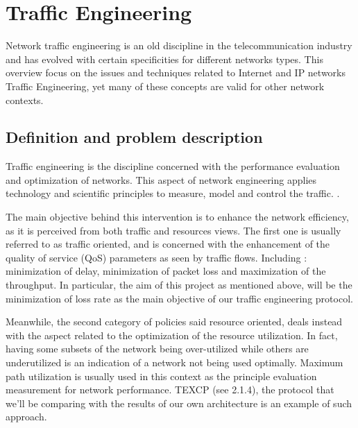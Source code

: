 \section{Traffic Engineering}

Network traffic engineering is an old discipline in the telecommunication industry and has evolved with certain specificities for different networks types. This overview focus on the issues and techniques related to Internet and IP networks Traffic Engineering, yet many of these concepts are valid for other network contexts.

\subsection{Definition and problem description}
Traffic engineering is the discipline concerned with the performance evaluation  and optimization of  networks.  This aspect of network engineering applies technology and scientific principles to measure, model and control the traffic.  \cite {RFC3272}.  

The main objective behind this intervention is to enhance the network efficiency, as it is perceived  from both  traffic and  resources views. The first one is usually referred to as traffic oriented, and is concerned with the enhancement of the quality of service (QoS) parameters as seen by traffic flows. Including : minimization of delay, minimization of packet loss and maximization of the throughput. In particular, the aim of this project as mentioned above, will be the minimization of loss rate as the main objective of our traffic engineering protocol.

Meanwhile, the second category of policies said resource oriented,  deals instead with the aspect related to the optimization of the resource utilization. In fact, having some subsets of the network being over-utilized while others are underutilized is an indication of a network not being used optimally. Maximum path utilization is usually used in this context as the principle evaluation measurement for network performance. TEXCP (see 2.1.4), the protocol that we'll be comparing with the results of our own architecture is an example of such approach. 

